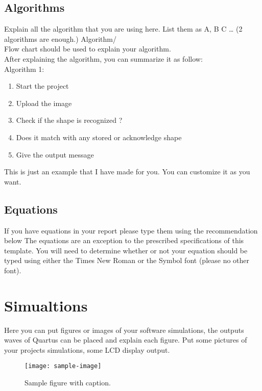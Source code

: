 \documentclass[10pt,sigconf, review]{article}
\begin{document}
\subsection{Algorithms}
Explain all the algorithm that you are using here. List them as A, B C … (2
algorithms are enough.) Algorithm/\\
Flow chart should be used to explain your algorithm.\\
After explaining the algorithm, you can summarize it as follow:\\

Algorithm 1:
\begin{enumerate}
	\item Start the project
	\item Upload the image 
	\item Check if the shape is recognized ?
  \item Does it match with any stored or acknowledge shape
  \item Give the output message
\end{enumerate}

This is just an example that I have made for you. You can customize it as you
want.

\subsection{Equations}
If you have equations in your report please type them using the recommendation below
The equations are an exception to the prescribed specifications of this
template. You will need to determine whether or not your equation should be
typed using either the Times New Roman or the Symbol font (please no other
font).


\section{Simualtions}
Here you can put figures or images of your software simulations, the outputs
waves of Quartus can be placed and explain each figure. Put some pictures of
your projects simulations, some LCD display output.

\begin{figure}[thb]
    \centering
	\texttt{[image: sample-image]}
	\caption{Sample figure with caption.}
	\label{fig: sample-figure}       %
\end{figure}
\end{document}
